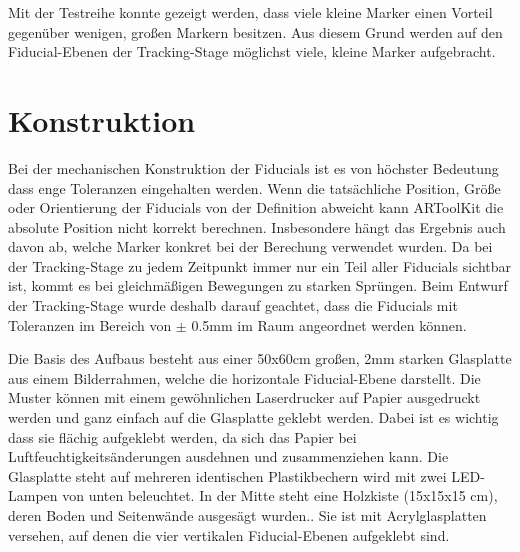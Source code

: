 
   Mit der Testreihe konnte gezeigt werden, dass viele kleine Marker einen Vorteil gegenüber wenigen, großen Markern besitzen.
   Aus diesem Grund werden auf den Fiducial-Ebenen der Tracking-Stage möglichst viele, kleine Marker aufgebracht. 

  \section{Konstruktion}  
    
    Bei der mechanischen Konstruktion der Fiducials ist es von höchster Bedeutung dass enge Toleranzen eingehalten werden.
    Wenn die tatsächliche Position, Größe oder Orientierung der Fiducials von der Definition abweicht kann ARToolKit die absolute Position nicht korrekt berechnen.
    Insbesondere hängt das Ergebnis auch davon ab, welche Marker konkret bei der Berechung verwendet wurden. 
    Da bei der Tracking-Stage zu jedem Zeitpunkt immer nur ein Teil aller Fiducials sichtbar ist, kommt es bei gleichmäßigen Bewegungen zu starken Sprüngen. 
    Beim Entwurf der Tracking-Stage wurde deshalb darauf geachtet, dass die Fiducials mit Toleranzen im Bereich von $\pm$ 0.5mm im Raum angeordnet werden können.

    Die Basis des Aufbaus besteht aus einer 50x60cm großen, 2mm starken Glasplatte aus einem Bilderrahmen, welche die horizontale Fiducial-Ebene darstellt.
    Die Muster können mit einem gewöhnlichen Laserdrucker auf Papier ausgedruckt werden und ganz einfach auf die Glasplatte geklebt werden.
    Dabei ist es wichtig dass sie flächig aufgeklebt werden, da sich das Papier bei Luftfeuchtigkeitsänderungen  ausdehnen und zusammenziehen kann.
    Die Glasplatte steht auf mehreren identischen Plastikbechern  wird mit zwei LED-Lampen von unten beleuchtet.
    In der Mitte steht eine Holzkiste (15x15x15 cm), deren Boden und Seitenwände ausgesägt wurden..
    Sie ist mit Acrylglasplatten versehen, auf denen die vier vertikalen Fiducial-Ebenen aufgeklebt sind.
    
